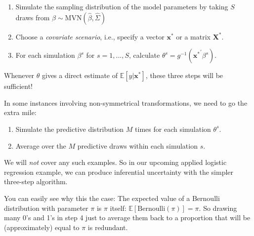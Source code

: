 \documentclass[
  11pt,
]{article}
\providecommand{\tightlist}{%
  \setlength{\itemsep}{0pt}\setlength{\parskip}{0pt}}
\begin{document}
\begin{enumerate}
\def\labelenumi{\arabic{enumi}.}
\tightlist
\item
  Simulate the sampling distribution of the model parameters by taking \(S\) draws from \(\beta \sim \text{MVN}(\hat\beta, \hat \Sigma)\)
\item
  Choose a \emph{covariate scenario}, i.e., specify a vector \(\mathbf{x^{\ast}}\) or a matrix \(\mathbf{X^{\ast}}\).
\item
  For each simulation \(\beta^{s}\) for \(s=1,...,S\), calculate \(\theta^{s} = g^{-1}(\mathbf{x^{\ast}}^{\prime} \beta^{s})\).
\end{enumerate}

Whenever \(\theta\) gives a direct estimate of \(\mathbb{E}[y|\mathbf{x^{\ast}}]\), these three steps will be sufficient!

In some instances involving non-symmetrical transformations, we need to go the extra mile:

\begin{enumerate}
\def\labelenumi{\arabic{enumi}.}
\setcounter{enumi}{3}
\tightlist
\item
  Simulate the predictive distribution \(M\) times for each simulation \(\theta^{s}\).
\item
  Average over the \(M\) predictive draws within each simulation \(s\).
\end{enumerate}

We will \emph{not} cover any such examples. So in our upcoming applied logistic regression example, we can produce inferential uncertainty with the simpler three-step algorithm.

You can easily see why this the case: The expected value of a Bernoulli distribution with parameter \(\pi\) is \(\pi\) itself: \(\mathbb{E}[\text{Bernoulli}(\pi)] = \pi\). So drawing many 0's and 1's in step 4 just to average them back to a proportion that will be (approximately) equal to \(\pi\) is redundant.
\end{document}
